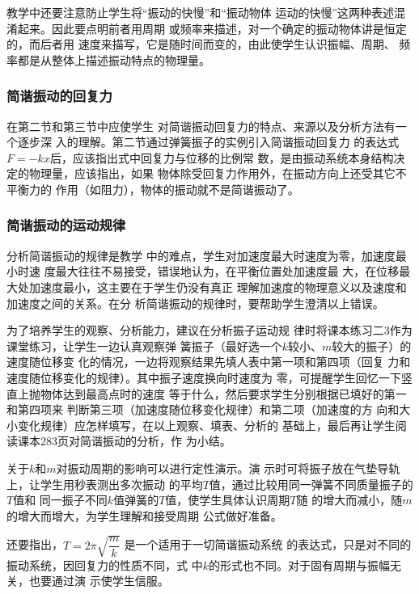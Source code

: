 教学中还要注意防止学生将“振动的快慢”和“振动物体
运动的快慢”这两种表述混淆起来。因此要点明前者用周期
或频率来描述，对一个确定的振动物体讲是恒定的，而后者用
速度来描写，它是随时间而变的，由此使学生认识振幅、周期、
频率都是从整体上描述振动特点的物理量。

\subsubsection{简谐振动的回复力}

在第二节和第三节中应使学生
对简谐振动回复力的特点、来源以及分析方法有一个逐步深
入的理解。第二节通过弹簧振子的实例引入简谐振动回复力
的表达式$F=-kx$后，应该指出式中回复力与位移的比例常
数，是由振动系统本身结构决定的物理量，应该指出，如果
物体除受回复力作用外，在振动方向上还受其它不平衡力的
作用（如阻力），物体的振动就不是简谐振动了。

\subsubsection{简谐振动的运动规律}

分析简谐振动的规律是教学
中的难点，学生对加速度最大时速度为零，加速度最小时速
度最大往往不易接受，错误地认为，在平衡位置处加速度最
大，在位移最大处加速度最小，这主要在于学生仍没有真正
理解加速度的物理意义以及速度和加速度之间的关系。在分
析简谐振动的规律时，要帮助学生澄清以上错误。

为了培养学生的观察、分析能力，建议在分析振子运动规
律时将课本练习二3作为课堂练习，让学生一边认真观察弹
簧振子（最好选一个$k$较小、$m$较大的振子）的速度随位移变
化的情况，一边将观察结果先填人表中第一项和第四项（回复
力和速度随位移变化的规律）。其中振子速度换向时速度为
零，可提醒学生回忆一下竖直上抛物体达到最高点时的速度
等于什么，然后要求学生分别根据已填好的第一和第四项来
判断第三项（加速度随位移变化规律）和第二项（加速度的方
向和大小变化规律）应怎样填写，在以上观察、填表、分析的
基础上，最后再让学生阅读课本283页对简谐振动的分析，作
为小结。

关于$k$和$m$对振动周期的影响可以进行定性演示。演
示时可将振子放在气垫导轨上，让学生用秒表测出多次振动
的平均$T$值，通过比较用同一弹簧不同质量振子的$T$值和
同一振子不同$k$值弹簧的$T$值，使学生具体认识周期$T$随
的增大而减小，随$m$的增大而增大，为学生理解和接受周期
公式做好准备。


还要指出，$T=2\pi\sqrt{\dfrac{m}{k}}$
是一个适用于一切简谐振动系统
的表达式，只是对不同的振动系统，因回复力的性质不同，式
中$k$的形式也不同。对于固有周期与振幅无关，也要通过演
示使学生信服。

